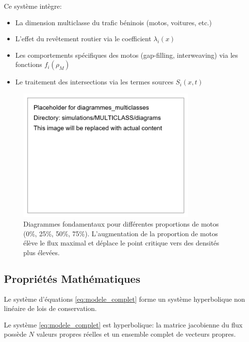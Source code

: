 Ce système intègre:
\begin{itemize}
\item La dimension multiclasse du trafic béninois (motos, voitures, etc.)
\item L'effet du revêtement routier via le coefficient $\lambda_i(x)$
\item Les comportements spécifiques des motos (gap-filling, interweaving) via les fonctions $f_i(\rho_M)$
\item Le traitement des intersections via les termes sources $S_i(x,t)$
\end{itemize}

\begin{figure}[htbp]
\centering
\includegraphics[width=0.8\textwidth]{simulations/MULTICLASS/diagrams/diagrammes_multiclasses}
\caption{Diagrammes fondamentaux pour différentes proportions de motos (0\%, 25\%, 50\%, 75\%). L'augmentation de la proportion de motos élève le flux maximal et déplace le point critique vers des densités plus élevées.}
\label{fig:diagramme_multiclasse}
\end{figure}

\subsection{Propriétés Mathématiques}
\label{subsec:proprietes_mathematiques}

Le système d'équations \eqref{eq:modele_complet} forme un système hyperbolique non linéaire de lois de conservation.

\begin{theorem}
Le système \eqref{eq:modele_complet} est hyperbolique: la matrice jacobienne du flux possède $N$ valeurs propres réelles et un ensemble complet de vecteurs propres.
\end{theorem}

